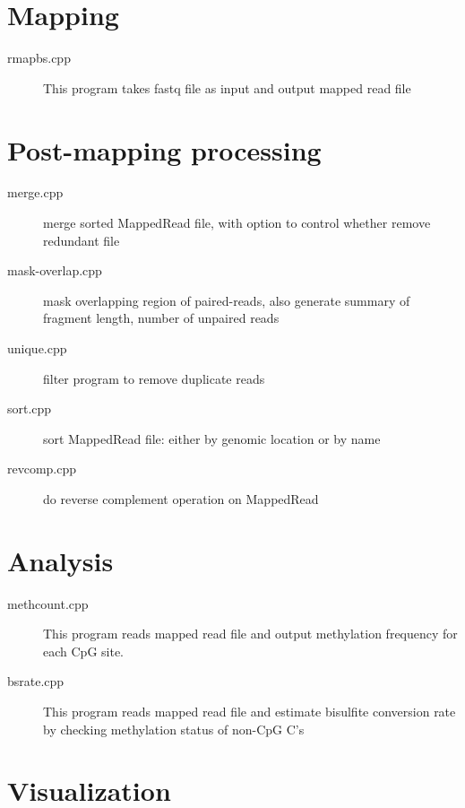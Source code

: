 \documentclass{article}
\begin{document}
\section{Mapping}
\label{sec:mapping}
\begin{description}
\item[rmapbs.cpp]
This program takes fastq file as input and output mapped read file
\end{description}

\section{Post-mapping processing}
\label{sec:postmapping}

\begin{description}
\item[merge.cpp]
merge sorted MappedRead file, with option to control whether remove redundant file

\item[mask-overlap.cpp]
mask overlapping region of paired-reads, also generate summary of fragment length,
number of unpaired reads

\item[unique.cpp ]
filter program to remove duplicate reads

\item[ sort.cpp ]
sort MappedRead file: either by genomic location or by name

\item[ revcomp.cpp ]
do reverse complement operation on MappedRead

\end{description}

\section{Analysis}
\label{sec:analysis}

\begin{description}
\item[methcount.cpp]
This program reads mapped read file and output methylation frequency
for each CpG site.

\item[bsrate.cpp]
This program reads mapped read file and estimate bisulfite conversion
rate by checking methylation status of non-CpG C's

\end{description}

\section{Visualization}
\label{sec:visualization}
\end{document}
